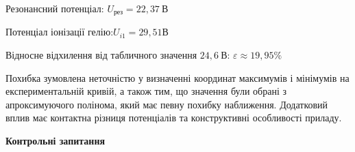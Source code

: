 \documentclass[12pt,a4paper]{article}
\begin{document}
    \vspace{1em}

    Резонансний потенціал: \(U_{\text{рез}} = 22{,}37~\text{В}\)

    Потенціал іонізації гелію:\(U_{i1} = 29{,}51\text{В}\)

    Відносне відхилення від табличного значення \( 24{,}6~\text{В} \): \(\varepsilon \approx 19{,}95\%\)

    \vspace{1em}

    Похибка зумовлена неточністю у визначенні координат максимумів і мінімумів на експериментальній кривій, а також тим, що значення були обрані з
    апроксимуючого полінома, який має певну похибку наближення. Додатковий вплив має контактна різниця потенціалів та конструктивні особливості приладу.

    \vspace{3em}

    \begin{center} \textbf{\large Контрольні запитання} \end{center}
\end{document}
